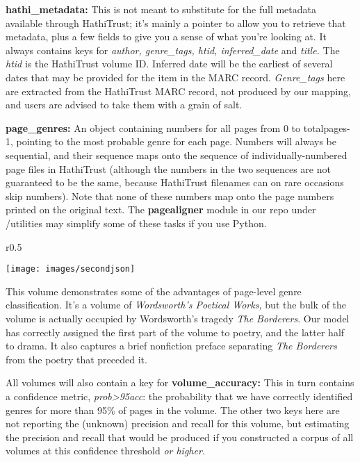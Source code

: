 \documentclass[paper=a4, fontsize=12pt]{scrartcl}
\numberwithin{equation}{section}		%
\numberwithin{figure}{section}			%
\numberwithin{table}{section}				%
\begin{document}
\vspace{2mm}
\noindent \textbf{hathi\_metadata:} This is not meant to substitute for the full metadata available through HathiTrust; it's mainly a pointer to allow you to retrieve that metadata, plus a few fields to give you a sense of what you're looking at. It always contains keys for \textit{author, genre\_tags, htid, inferred\_date} and \textit{title.} The \textit{htid} is the HathiTrust volume ID. Inferred date will be the earliest of several dates that may be provided for the item in the MARC record. \textit{Genre\_tags} here are extracted from the HathiTrust MARC record, not produced by our mapping, and users are advised to take them with a grain of salt.

\vspace{2mm}
\noindent \textbf{page\_genres:} An object containing numbers for all pages from 0 to totalpages-1, pointing to the most probable genre for each page. Numbers will always be sequential, and their sequence maps onto the sequence of individually-numbered page files in HathiTrust (although the numbers in the two sequences are not guaranteed to be the same, because HathiTrust filenames can on rare occasions skip numbers). Note that none of these numbers map onto the page numbers printed on the original text. The \textbf{pagealigner} module in our repo under /utilities may simplify some of these tasks if you use Python.

\begin{wrapfigure}[26]{r}{0.5\textwidth}
  \begin{centering}
    \texttt{[image: images/secondjson]}
  \end{centering}
\end{wrapfigure}

This volume demonstrates some of the advantages of page-level genre classification. It's a volume of \textit{Wordsworth's Poetical Works,} but the bulk of the volume is actually occupied by Wordsworth's tragedy \textit{The Borderers}. Our model has correctly assigned the first part of the volume to poetry, and the latter half to drama. It also captures a brief nonfiction preface separating \textit{The Borderers} from the poetry that preceded it.

\vspace{2mm}
\noindent All volumes will also contain a key for \textbf{volume\_accuracy:} This in turn contains a confidence metric, \textit{prob>95acc}: the probability that we have correctly identified genres for more than 95\% of pages in the volume. The other two keys here are not reporting the (unknown) precision and recall for this volume, but estimating the precision and recall that would be produced if you constructed a corpus of all volumes at this confidence threshold \textit{or higher.}
\end{document}
